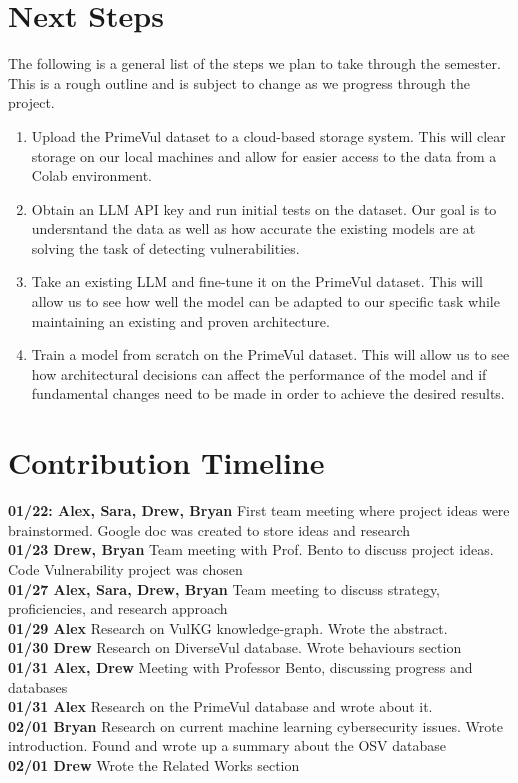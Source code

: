 \documentclass{article}
\begin{document}
\section{Next Steps}
The following is a general list of the steps we plan to take through the semester.
This is a rough outline and is subject to change as we progress through the project.

\begin{enumerate}
  \item Upload the PrimeVul dataset to a cloud-based storage system. This will clear 
    storage on our local machines and allow for 
    easier access to the data from a Colab environment.
  \item Obtain an LLM API key and run initial tests on the dataset. Our goal is to 
    undersntand the data as well as how accurate the existing models are at solving
    the task of detecting vulnerabilities.
  \item Take an existing LLM and fine-tune it on the PrimeVul dataset. This will allow
    us to see how well the model can be adapted to our specific task while maintaining
    an existing and proven architecture.
  \item Train a model from scratch on the PrimeVul dataset. This will allow us to see
    how architectural decisions can affect the performance of the model and if fundamental
    changes need to be made in order to achieve the desired results.
\end{enumerate}

\section{Contribution Timeline}
\textbf{01/22: Alex, Sara, Drew, Bryan} First team meeting where project ideas were
brainstormed. Google doc was created to store ideas and research \\
\textbf{01/23 Drew, Bryan} Team meeting with Prof. Bento to discuss project ideas.
Code Vulnerability project was chosen \\
\textbf{01/27 Alex, Sara, Drew, Bryan} Team meeting to discuss strategy, proficiencies, 
and research approach \\
\textbf{01/29 Alex} Research on VulKG knowledge-graph. Wrote the abstract. \\
\textbf{01/30 Drew} Research on DiverseVul database. Wrote behaviours section \\
\textbf{01/31 Alex, Drew} Meeting with Professor Bento, discussing progress and databases \\
\textbf{01/31 Alex} Research on the PrimeVul database and wrote about it. \\
\textbf{02/01 Bryan} Research on current machine learning cybersecurity issues. Wrote
introduction. Found and wrote up a summary about the OSV database \\
\textbf{02/01 Drew} Wrote the Related Works section \\

      

\end{document}
